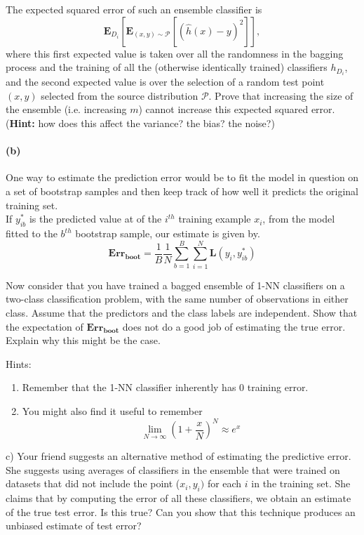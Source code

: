 \documentclass[11pt]{article}
\begin{document}
The expected squared error of such an ensemble classifier is
\[
	\mathbf{E}_{D_i}\left[ \mathbf{E}_{(x, y) \sim \mathcal{P}}\left[ (\hat h(x) - y)^2 \right] \right],
\]
where this first expected value is taken over all the randomness in the bagging process and the training of all the (otherwise identically trained) classifiers $h_{D_i}$, and the second expected value is over the selection of a random test point $(x,y)$ selected from the source distribution $\mathcal{P}$.
Prove that increasing the size of the ensemble (i.e. increasing $m$) cannot increase this expected squared error. (\textbf{Hint:} how does this affect the variance? the bias? the noise?)

\paragraph{(b)} One way to estimate the prediction error would be to fit the model in question on a set of bootstrap samples and then keep track of how well it predicts the original training set.\\

If $y_{ib}^*$ is the predicted value at of the $i^{th}$ training example $x_i$, from the model fitted to the $b^{th}$ bootstrap sample, our estimate is given by. \\

\[
        \mathbf{Err_{boot}} = \frac{1}{B}\frac{1}{N}\sum_{b=1}^{B}\sum_{i=1}^{N}
        \mathbf{L}(y_i,y_{ib}^*)
\]

Now consider that you have trained a bagged ensemble of 1-NN classifiers on a two-class classification problem, with the same number of observations in either class. Assume that the predictors and the class labels are independent. Show that the expectation of $\mathbf{Err_{boot}}$ does not do a good job of estimating the true error. Explain why this might be the case.

Hints: \\ 
\begin{enumerate}
    \item Remember that the 1-NN classifier inherently has 0 training error.
    \item You might also find it useful to remember 
\[
    \lim_{N \to \infty} (1+\frac{x}{N})^N \approx e^x 
\]
\end{enumerate}

c) Your friend suggests an alternative method of estimating the predictive error. She suggests using averages of classifiers in the ensemble that were trained on datasets that did not include the point ($x_i,y_i)$ for each $i$ in the training set. She claims that by computing the error of all these classifiers, we obtain an estimate of the true test error. Is this true? Can you show that this technique produces an unbiased estimate of test error?
\end{document}
